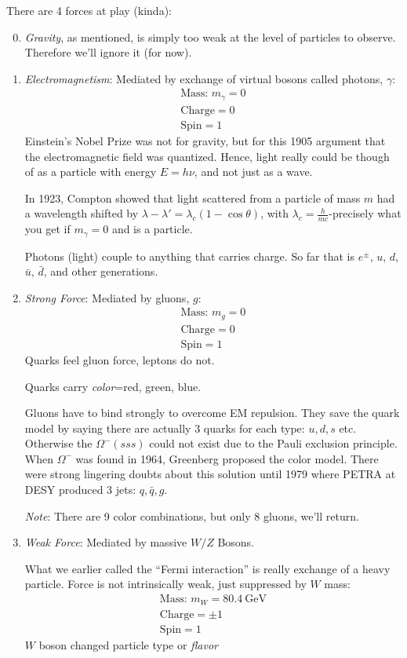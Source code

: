 There are 4 forces at play (kinda):
\begin{enumerate}
  \setcounter{enumi}{-1}
\item \emph{Gravity}, as mentioned, is simply too weak at the level of particles to observe. Therefore we'll ignore it (for now).
\item \emph{Electromagnetism}: Mediated by exchange of virtual bosons called photons, $\gamma$:
  \begin{gather*}
    \text{Mass: } m_\gamma= 0\\
    \text{Charge}=0\\
    \text{Spin}=1
  \end{gather*}
  Einstein's Nobel Prize was not for gravity, but for this 1905 argument that the electromagnetic field was quantized. Hence, light really could be though of as a particle with energy $E=h\nu$, and not just as a wave.

  In 1923, Compton showed that light scattered from a particle of mass $m$ had a wavelength shifted by $\lambda-\lambda'=\lambda_c(1-\cos\theta)$, with $\lambda_c=\frac{h}{mc}$-precisely what you get if $m_\gamma=0$ and is a particle.

  Photons (light) couple to anything that carries charge. So far that is $e^\pm$, $u$, $d$, $\bar{u}$, $\bar{d}$, and other generations.
\item \emph{Strong Force}: Mediated by gluons, $g$:
    \begin{gather*}
    \text{Mass: } m_g= 0\\
    \text{Charge}=0\\
    \text{Spin}=1
  \end{gather*}
  Quarks feel gluon force, leptons do not.

  Quarks carry \emph{color}=red, green, blue.

  Gluons have to bind strongly to overcome EM repulsion. They save the quark model by saying there are actually 3 quarks for each type: $u,d,s$ etc. Otherwise the $\Omega^-(sss)$  could not exist due to the Pauli exclusion principle. When $\Omega^-$ was found in 1964, Greenberg proposed the color model. There were strong lingering doubts about this solution until 1979 where PETRA at DESY produced 3 jets: $q,\bar{q},g$.

  \emph{Note}: There are 9 color combinations, but only 8 gluons, we'll return.
\item \emph{Weak Force}: Mediated by massive $W/Z$ Bosons.

  What we earlier called the ``Fermi interaction'' is really exchange of a heavy particle. Force is not intrinsically weak, just suppressed by $W$ mass:
  \begin{gather*}
    \text{Mass: } m_W= \SI{80.4}{\GeV}\\
    \text{Charge}=\pm1\\
    \text{Spin}=1
  \end{gather*}
  $W$ boson changed particle type or \emph{flavor}
\end{enumerate}

